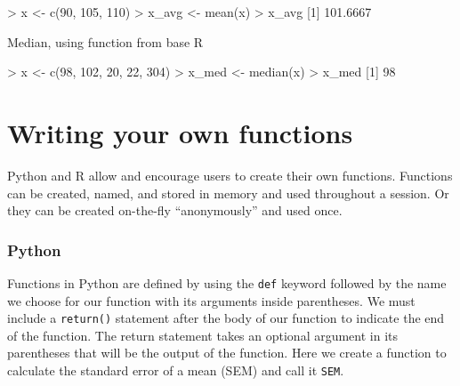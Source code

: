 \documentclass[
]{book}
\newenvironment{Shaded}{\begin{snugshade}}{\end{snugshade}}
\newcommand{\DecValTok}[1]{\textcolor[rgb]{0.00,0.00,0.81}{#1}}
\newcommand{\FloatTok}[1]{\textcolor[rgb]{0.00,0.00,0.81}{#1}}
\newcommand{\FunctionTok}[1]{\textcolor[rgb]{0.00,0.00,0.00}{#1}}
\newcommand{\NormalTok}[1]{#1}
\newcommand{\OtherTok}[1]{\textcolor[rgb]{0.56,0.35,0.01}{#1}}
\newcommand{\SpecialCharTok}[1]{\textcolor[rgb]{0.00,0.00,0.00}{#1}}
\begin{document}
\begin{Shaded}
\begin{Highlighting}[]
\SpecialCharTok{\textgreater{}}\NormalTok{ x }\OtherTok{\textless{}{-}} \FunctionTok{c}\NormalTok{(}\DecValTok{90}\NormalTok{, }\DecValTok{105}\NormalTok{, }\DecValTok{110}\NormalTok{)}
\SpecialCharTok{\textgreater{}}\NormalTok{ x\_avg }\OtherTok{\textless{}{-}} \FunctionTok{mean}\NormalTok{(x)}
\SpecialCharTok{\textgreater{}}\NormalTok{ x\_avg}
\NormalTok{[}\DecValTok{1}\NormalTok{] }\FloatTok{101.6667}
\end{Highlighting}
\end{Shaded}

Median, using function from base R

\begin{Shaded}
\begin{Highlighting}[]
\SpecialCharTok{\textgreater{}}\NormalTok{ x }\OtherTok{\textless{}{-}} \FunctionTok{c}\NormalTok{(}\DecValTok{98}\NormalTok{, }\DecValTok{102}\NormalTok{, }\DecValTok{20}\NormalTok{, }\DecValTok{22}\NormalTok{, }\DecValTok{304}\NormalTok{)}
\SpecialCharTok{\textgreater{}}\NormalTok{ x\_med }\OtherTok{\textless{}{-}} \FunctionTok{median}\NormalTok{(x)}
\SpecialCharTok{\textgreater{}}\NormalTok{ x\_med}
\NormalTok{[}\DecValTok{1}\NormalTok{] }\DecValTok{98}
\end{Highlighting}
\end{Shaded}

\hypertarget{writing-your-own-functions}{%
\section{Writing your own functions}\label{writing-your-own-functions}}

Python and R allow and encourage users to create their own functions. Functions can be created, named, and stored in memory and used throughout a session. Or they can be created on-the-fly ``anonymously'' and used once.

\hypertarget{python-7}{%
\subsubsection*{Python}\label{python-7}}

Functions in Python are defined by using the \texttt{def} keyword followed by the name we choose for our function with its arguments inside parentheses. We must include a \texttt{return()} statement after the body of our function to indicate the end of the function. The return statement takes an optional argument in its parentheses that will be the output of the function. Here we create a function to calculate the standard error of a mean (SEM) and call it \texttt{SEM}.
\end{document}
